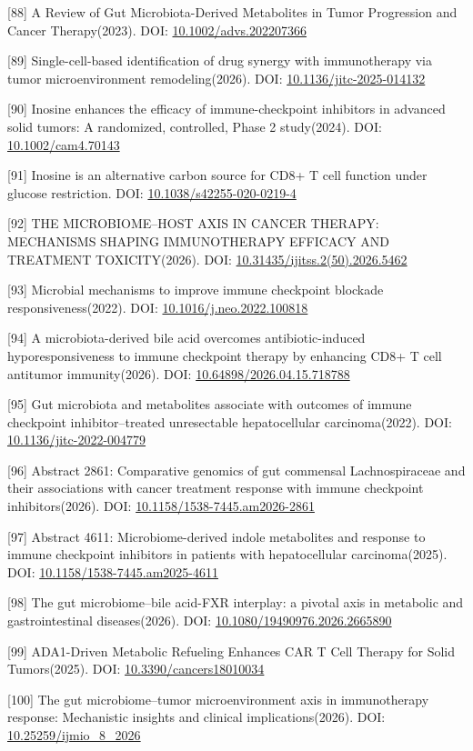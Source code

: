 {[}88{]} A Review of Gut Microbiota-Derived Metabolites in Tumor Progression and Cancer Therapy(2023). DOI: \url{10.1002/advs.202207366}

{[}89{]} Single-cell-based identification of drug synergy with immunotherapy via tumor microenvironment remodeling(2026). DOI: \url{10.1136/jitc-2025-014132}

{[}90{]} Inosine enhances the efficacy of immune-checkpoint inhibitors in advanced solid tumors: A randomized, controlled, Phase 2 study(2024). DOI: \url{10.1002/cam4.70143}

{[}91{]} Inosine is an alternative carbon source for CD8+ T cell function under glucose restriction. DOI: \url{10.1038/s42255-020-0219-4}

{[}92{]} THE MICROBIOME--HOST AXIS IN CANCER THERAPY: MECHANISMS SHAPING IMMUNOTHERAPY EFFICACY AND TREATMENT TOXICITY(2026). DOI: \url{10.31435/ijitss.2(50).2026.5462}

{[}93{]} Microbial mechanisms to improve immune checkpoint blockade responsiveness(2022). DOI: \url{10.1016/j.neo.2022.100818}

{[}94{]} A microbiota-derived bile acid overcomes antibiotic-induced hyporesponsiveness to immune checkpoint therapy by enhancing CD8+ T cell antitumor immunity(2026). DOI: \url{10.64898/2026.04.15.718788}

{[}95{]} Gut microbiota and metabolites associate with outcomes of immune checkpoint inhibitor--treated unresectable hepatocellular carcinoma(2022). DOI: \url{10.1136/jitc-2022-004779}

{[}96{]} Abstract 2861: Comparative genomics of gut commensal Lachnospiraceae and their associations with cancer treatment response with immune checkpoint inhibitors(2026). DOI: \url{10.1158/1538-7445.am2026-2861}

{[}97{]} Abstract 4611: Microbiome-derived indole metabolites and response to immune checkpoint inhibitors in patients with hepatocellular carcinoma(2025). DOI: \url{10.1158/1538-7445.am2025-4611}

{[}98{]} The gut microbiome--bile acid-FXR interplay: a pivotal axis in metabolic and gastrointestinal diseases(2026). DOI: \url{10.1080/19490976.2026.2665890}

{[}99{]} ADA1-Driven Metabolic Refueling Enhances CAR T Cell Therapy for Solid Tumors(2025). DOI: \url{10.3390/cancers18010034}

{[}100{]} The gut microbiome--tumor microenvironment axis in immunotherapy response: Mechanistic insights and clinical implications(2026). DOI: \url{10.25259/ijmio_8_2026}

